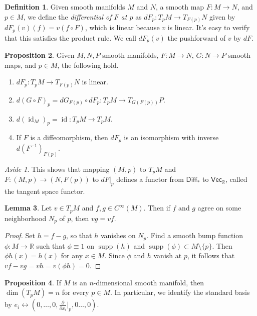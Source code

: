 \documentclass[10pt,letterpaper,cm]{nupset}
\theoremstyle{definition}
\newtheorem{definition}{Definition}[subsection]
\theoremstyle{theorem}
\newtheorem{lemma}[definition]{Lemma}
\newtheorem{prop}[definition]{Proposition}
\theoremstyle{remark}
\newtheorem*{aside}{Aside}
\newcommand{\R}{\mathbb R}
\newcommand{\1}{\mathbf{1}}
\newcommand{\0}{\vec 0}
\DeclareMathOperator{\id}{id}
\DeclareMathOperator{\supp}{supp}
\begin{document}
\begin{definition}
Given smooth manifolds $M$ and $N$, a smooth map $F: M \to N$, and $p\in M$,  we define the \textit{differential of $F$ at $p$} as $dF_p: T_pM \to T_{F(p)}N$ given by $dF_p(v)(f) = v(f \circ F)$, which is linear because $v$ is linear. It's easy to verify that this satisfies the product rule. We call $dF_p(v)$ the pushforward of $v$ by $dF$.
\end{definition}

\begin{prop}
Given $M, N, P$ smooth manifolds, $F: M \to N$, $G: N \to P$ smooth maps, and $p\in M$, the following hold. 
\begin{enumerate}
\item $dF_p: T_pM \to T_{F(p)}N$ is linear. 
\item $d(G \circ F)_p = dG_{F(p)} \circ dF_p : T_pM \to T_{G(F(p))}P$.
\item $d(\id_M)_p = \id : T_pM \to T_pM$.
\item If $F$ is a diffeomorphism, then $dF_p$ is an isomorphism with inverse $d(F^{-1})_{F(p)}$.
\end{enumerate}
\end{prop}

\begin{aside}
This shows that mapping $(M, p)$ to $T_pM$ and $F: (M, p) \to(N, F(p))$ to $dF\rvert_p$ defines a functor from $\mathsf{Diff}_{\ast}$ to $\mathsf{Vec}_{\R}$, called the tangent space functor.
\end{aside}

\begin{lemma}
Let $v \in T_pM$ and $f, g\in C^{\infty}(M)$. Then if $f$ and $g$ agree on some neighborhood $N_p$ of $p$, then $vg = vf$. 
\end{lemma}
\begin{proof}
Set $h = f-g$, so that $h$ vanishes on $N_p$. Find a smooth bump function $\phi: M \to \R$ such that $\phi \equiv 1$ on $\supp(h)$ and $\supp(\phi) \subset M \setminus \{p\}$. Then $\phi h(x) = h(x)$ for any $x\in M$. Since $\phi$ and $h$ vanish at $p$, it follows that $vf -vg = vh = v(\phi h) = 0.$
\end{proof}

\begin{prop}
If $M$ is an $n$-dimensional smooth manifold, then $\dim(T_pM) =n$ for every $p\in M$. In particular, we identify the standard basis by $e_i \leftrightarrow (0, \ldots, 0, \frac{\partial}{\partial{x_i}}\rvert_p, 0 \ldots, 0)$.
\end{prop}
\end{document}
